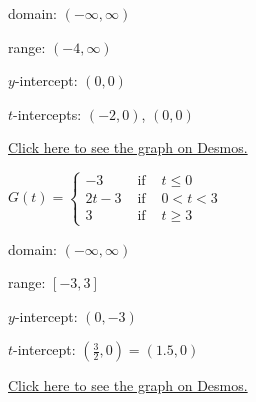 \documentclass{ximera}
\begin{document}
\begin{question}
\begin{problem}
\begin{solution}

domain: $(-\infty, \infty)$

range:  $(-4, \infty)$

$y$-intercept:  $(0,0)$

$t$-intercepts: $(-2,0)$, $(0,0)$

\href{https://www.desmos.com/calculator/jcgdaslrdx}{Click here to see the graph on Desmos.}

\end{solution}

\end{problem}

\begin{problem}\label{graphpwiseexerlast}
$G(t) = \left\{ \begin{array}{rcl}  -3 & \mbox{ if } & t \leq 0 \\
2t-3 & \mbox{ if } & 0 < t < 3 \\
3 & \mbox{ if } & t \geq 3
 \end{array} \right.$

\begin{solution}

domain: $(-\infty, \infty)$

range:  $[-3, 3]$

$y$-intercept:  $(0,-3)$

$t$-intercept: $\left(\frac{3}{2}, 0 \right) = (1.5,0)$

\href{https://www.desmos.com/calculator/fw0slj2chl}{Click here to see the graph on Desmos.}

\end{solution}

\end{problem}

\end{question}
\end{document}
